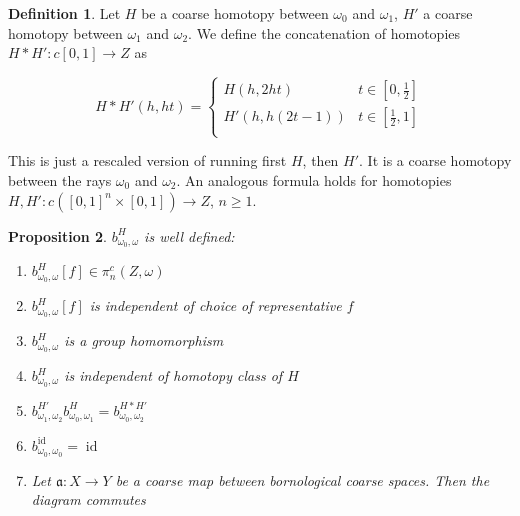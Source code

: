 \documentclass[a4paper,11pt]{article}
\theoremstyle{definition}
\newtheorem{definition}{Definition}[section]
\theoremstyle{plain}
\newtheorem{prop}[definition]{Proposition}
\theoremstyle{remark}
\DeclareMathOperator{\id}{id}
\begin{document}
 \begin{definition} Let $H$ be a coarse homotopy between $\omega_0$ and $\omega_1$, $H'$ a coarse homotopy between $\omega_1$ and $\omega_2$. We define the concatenation of homotopies $H\ast H' :c[0,1] \rightarrow Z$ as 

\[ H\ast H'(h,ht) = \begin{cases} 
          H(h, 2ht) & t \in [0,\frac{1}{2}] \\
          H'(h, h(2t-1)) & t\in [\frac{1}{2},1] \\ 
       \end{cases}
    \]
 \end{definition}
This is just a rescaled version of running first $H$, then $H'$. It is a coarse homotopy between the rays $\omega_0$ and $\omega_2$. An analogous formula holds for homotopies $H,H': c([0,1]^n \times [0,1])\rightarrow Z$, $n\geq 1$.

\begin{prop}\label{baseddefined} $b^H_{\omega_0,\omega}$ is well defined: 
\begin{enumerate}
\item $b^H_{\omega_0,\omega}[f]\in \pi_{n}^{c}(Z,\omega)$
\item $b^H_{\omega_0,\omega}[f]$ is independent of choice of representative $f$
\item $b^H_{\omega_0,\omega}$ is a group homomorphism 
\item $b^H_{\omega_0,\omega}$ is independent of homotopy class of $H$
\item $b_{\omega_1,\omega_2}^{H'}b_{\omega_0,\omega_1}^{H}= b_{\omega_0,\omega_2}^{H\ast H'}$
\item $b_{\omega_0,\omega_0}^{\id} = \id$
\item Let $\mathfrak{a}: X\rightarrow Y$ be a coarse map between bornological coarse spaces. Then the diagram commutes

\begin{figure}[H]
\center
{}
\end{figure}

\end{enumerate}
\end{prop}
\end{document}
